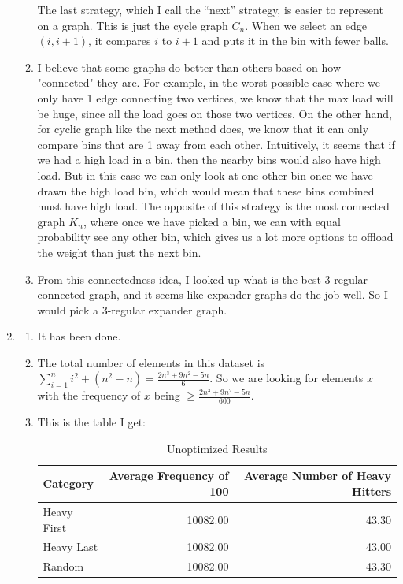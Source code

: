\documentclass[12pt]{article}
\theoremstyle{definitionstyle}
\begin{document}
\begin{enumerate}[leftmargin=\labelsep]
\begin{enumerate}[label=(\alph*)]
            The last strategy, which I call the ``next'' strategy, is easier to represent on a graph. This is just the cycle graph $C_n$. When we select an edge $(i, i+1)$, it compares $i$ to $i+1$ and puts it in the bin with fewer balls. 

            \item I believe that some graphs do better than others based on how "connected" they are. For example, in the worst possible case where we only have 1 edge connecting two vertices, we know that the max load will be huge, since all the load goes on those two vertices. On the other hand, for cyclic graph like the next method does, we know that it can only compare bins that are 1 away from each other. Intuitively, it seems that if we had a high load in a bin, then the nearby bins would also have high load. But in this case we can only look at one other bin once we have drawn the high load bin, which would mean that these bins combined must have high load. The opposite of this strategy is the most connected graph $K_n$, where once we have picked a bin, we can with equal probability see any other bin, which gives us a lot more options to offload the weight than just the next bin. 

            \item From this connectedness idea, I looked up what is the best 3-regular connected graph, and it seems like expander graphs do the job well. So I would pick a 3-regular expander graph. 
        \end{enumerate}

        \item
        \begin{enumerate}[label=(\alph*)]
            \item It has been done.
            \item The total number of elements in this dataset is $\sum_{i=1}^n i^2 + (n^2-n) = \frac{2n^3+9n^2-5n}{6}$. So we are looking for elements $x$ with the frequency of $x$ being $\geq \frac{2n^3+9n^2-5n}{600}$.

            \item This is the table I get:
            \begin{table}[h!]
                \centering
                \begin{tabular}{lrr}
                \toprule
                Category & Average Frequency of 100 & Average Number of Heavy Hitters \\
                \midrule
                Heavy First & 10082.00 & 43.30 \\
                Heavy Last  & 10082.00 & 43.00 \\
                Random      & 10082.00 & 43.30 \\
                \bottomrule
                \end{tabular}
                \caption{Unoptimized Results}
            \end{table}


\end{enumerate}
\end{enumerate}
\end{document}
